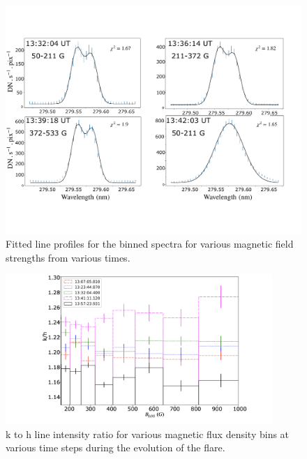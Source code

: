 \begin{figure}[ht!]
    \begin{center}
    \includegraphics[trim={0cm 3cm 0cm 3cm},clip,width=\textwidth]{Figures/binned_fit_fov.pdf}
    \end{center}
    \caption{Fitted line profiles for the binned spectra for various magnetic field strengths from various times.}
    \label{fig:fit_pix_fov}
\end{figure}

\begin{figure}[ht!]
    \centering
    \includegraphics[trim={8cm 1cm 2cm 0.2cm},clip,width=0.9\textwidth]{Figures/Flare-m-optical-depth-2.jpeg}
    \caption{  k to h line intensity ratio for various magnetic flux density bins at various time steps during the evolution of the flare.}
    \label{fig:optical_depth_m}
\end{figure}

